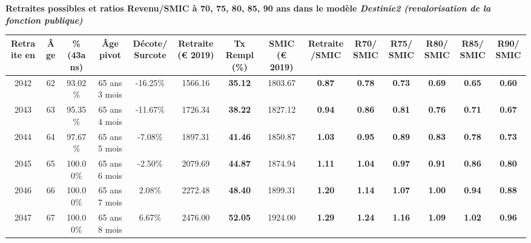  \vspace{0.1cm} 
{\bf \noindent Retraites possibles et ratios Revenu/SMIC à 70, 75, 80, 85, 90 ans dans le modèle \emph{Destinie2 (revalorisation de la fonction publique)}}  
 
\begin{adjustbox}{max width=\textwidth} 
\begin{tabular}[htb]{|c|c||c|c|c||c|c||c|c||c|c|c|c|c|} 
\hline 
 Retraite en &  Âge &  \%(43ans) &  Âge pivot &  Décote/Surcote &  Retraite (\euro{} 2019) &  Tx Rempl(\%) &  SMIC (\euro{} 2019) &  Retraite/SMIC &  R70/SMIC &  R75/SMIC &  R80/SMIC &  R85/SMIC &  R90/SMIC \\ 
\hline \hline 
 2042 &  62 &  93.02\% &  65 ans 3 mois &  -16.25\% &  1566.16 &  {\bf 35.12} &  1803.67 &  {\bf {\color{red} 0.87}} &  {\bf {\color{red} 0.78}} &  {\bf {\color{red} 0.73}} &  {\bf {\color{red} 0.69}} &  {\bf {\color{red} 0.65}} &  {\bf {\color{red} 0.60}} \\ 
\hline 
 2043 &  63 &  95.35\% &  65 ans 4 mois &  -11.67\% &  1726.34 &  {\bf 38.22} &  1827.12 &  {\bf {\color{red} 0.94}} &  {\bf {\color{red} 0.86}} &  {\bf {\color{red} 0.81}} &  {\bf {\color{red} 0.76}} &  {\bf {\color{red} 0.71}} &  {\bf {\color{red} 0.67}} \\ 
\hline 
 2044 &  64 &  97.67\% &  65 ans 5 mois &  -7.08\% &  1897.31 &  {\bf 41.46} &  1850.87 &  {\bf 1.03} &  {\bf {\color{red} 0.95}} &  {\bf {\color{red} 0.89}} &  {\bf {\color{red} 0.83}} &  {\bf {\color{red} 0.78}} &  {\bf {\color{red} 0.73}} \\ 
\hline 
 2045 &  65 &  100.00\% &  65 ans 6 mois &  -2.50\% &  2079.69 &  {\bf 44.87} &  1874.94 &  {\bf 1.11} &  {\bf 1.04} &  {\bf {\color{red} 0.97}} &  {\bf {\color{red} 0.91}} &  {\bf {\color{red} 0.86}} &  {\bf {\color{red} 0.80}} \\ 
\hline 
 2046 &  66 &  100.00\% &  65 ans 7 mois &  2.08\% &  2272.48 &  {\bf 48.40} &  1899.31 &  {\bf 1.20} &  {\bf 1.14} &  {\bf 1.07} &  {\bf {\color{red} 1.00}} &  {\bf {\color{red} 0.94}} &  {\bf {\color{red} 0.88}} \\ 
\hline 
 2047 &  67 &  100.00\% &  65 ans 8 mois &  6.67\% &  2476.00 &  {\bf 52.05} &  1924.00 &  {\bf 1.29} &  {\bf 1.24} &  {\bf 1.16} &  {\bf 1.09} &  {\bf 1.02} &  {\bf {\color{red} 0.96}} \\ 
\hline 
\hline 
\end{tabular} 
\end{adjustbox} 
 
 \vspace{0.1cm} 

